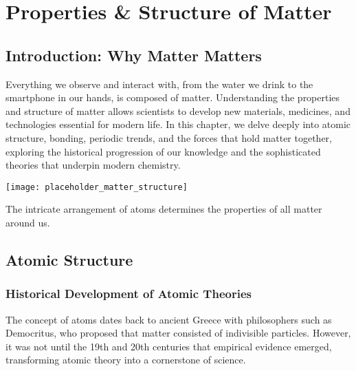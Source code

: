 \chapter{Properties \& Structure of Matter}

\section{Introduction: Why Matter Matters}
\FloatBarrier
\FloatBarrier
\FloatBarrier

Everything we observe and interact with, from the water we drink to the smartphone in our hands, is composed of matter. Understanding the properties and structure of matter allows scientists to develop new materials, medicines, and technologies essential for modern life. In this chapter, we delve deeply into atomic structure, bonding, periodic trends, and the forces that hold matter together, exploring the historical progression of our knowledge and the sophisticated theories that underpin modern chemistry.

\begin{marginfigure}[0pt][0pt][0pt]
\texttt{[image: placeholder\_matter\_structure]}
\caption{The intricate arrangement of atoms determines the properties of all matter around us.}
\label{fig:atomic_structure_intro}
\end{marginfigure}

\section{Atomic Structure}
\FloatBarrier
\FloatBarrier
\FloatBarrier

\subsection{Historical Development of Atomic Theories}
\FloatBarrier
\FloatBarrier
\FloatBarrier

The concept of atoms dates back to ancient Greece with philosophers such as Democritus, who proposed that matter consisted of indivisible particles. However, it was not until the 19th and 20th centuries that empirical evidence emerged, transforming atomic theory into a cornerstone of science.



